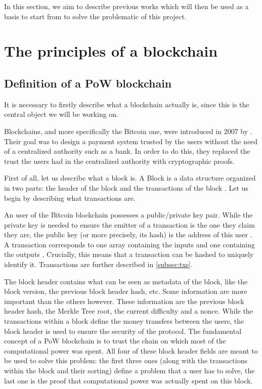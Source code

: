     In this section, we aim to describe previous works which will then be used as a basis to start from to solve the problematic of this project.
    
    \section{The principles of a blockchain}
      \subsection{Definition of a PoW blockchain}
        It is necessary to firstly describe what a blockchain actually is, since this is the central object we will be working on.
        
        Blockchains, and more specifically the Bitcoin one, were introduced in 2007 by \citeauthor{Bitcoin} \cite{Bitcoin}. Their goal was to design a payment system trusted by the users without the need of a centralized authority such as a bank. In order to do this, they replaced the trust the users had in the centralized authority with cryptographic proofs.
        
        First of all, let us describe what a block is. A Block is a data structure organized in two parts: the header of the block and the transactions of the block \cite{BitcoinHeader}. Let us begin by describing what transactions are.
        
        An user of the Bitcoin blockchain possesses a public/private key pair. While the private key is needed to ensure the emitter of a transaction is the one they claim they are, the public key (or more precisely, its hash) is the address of this user \cite{BitcoinTX}. A transaction corresponds to one array containing the inputs and one containing the outputs \cite{SoK}. Crucially, this means that a transaction can be hashed to uniquely identify it. Transactions are further described in \autoref{subsec:txs}.
        
        The block header contains what can be seen as metadata of the block, like the block version, the previous block header hash, etc. Some information are more important than the others however. These information are the previous block header hash, the Merkle Tree root, the current difficulty and a nonce. While the transactions within a block define the money transfers between the users, the block header is used to ensure the security of the protocol. The fundamental concept of a PoW blockchain is to trust the chain on which most of the computational power was spent. All four of these block header fields are meant to be used to solve this problem: the first three ones (along with the transactions within the block and their sorting) define a problem that a user has to solve, the last one is the proof that computational power was actually spent on this block.
        
